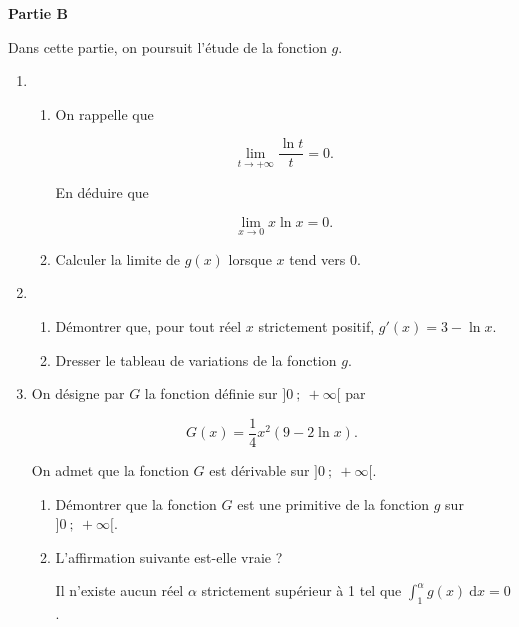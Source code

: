 \documentclass{cornouaille}
\begin{document}
\begin{exercice}
\begin{enumerate}
\end{enumerate}

\bigskip

\textbf{Partie B}

\medskip

Dans cette partie, on poursuit l'étude de la fonction $g$.

\medskip

\begin{enumerate}
\item 
	\begin{enumerate}
		\item On rappelle que
		
\[\displaystyle\lim_{t \to + \infty} \dfrac{\ln t}{t} = 0.  \]

En déduire que

\[\displaystyle\lim_{x \to 0} x \ln x = 0.\]

		\item Calculer la limite de $g(x)$ lorsque $x$ tend vers $0$.
	\end{enumerate}
\item
	\begin{enumerate}
		\item Démontrer que, pour tout réel $x$ strictement positif, $g'(x) = 3 - \ln x$.
		\item Dresser le tableau de variations de la fonction $g$.
	\end{enumerate}
\item On désigne par $G$ la fonction définie sur $]0~;~ +\infty[$ par 

\[G(x) = \dfrac{1}{4}x^2(9 - 2\ln x).\]

On admet que la fonction $G$ est dérivable sur $]0~;~ +\infty[$.
	\begin{enumerate}
		\item Démontrer que la fonction $G$ est une primitive de la fonction $g$ sur $]0~;~ +\infty[$.
		\item L'affirmation suivante est-elle vraie ?
		
\og Il n'existe aucun réel $\alpha$ strictement supérieur à 1 tel que $\displaystyle\int_1^{\alpha} g(x) \:\text{d}x = 0$. \fg
	\end{enumerate}
\end{enumerate}
\end{exercice}
\end{document}
